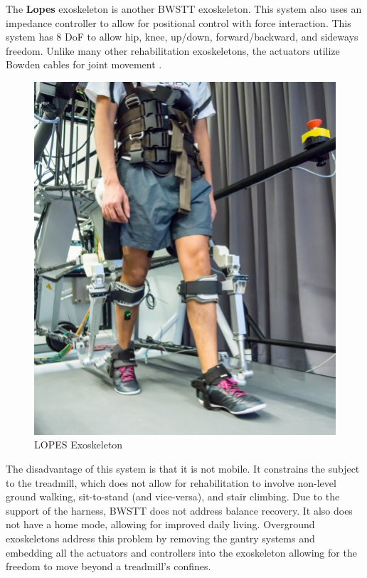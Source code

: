 The \textbf{Lopes} exoskeleton is another BWSTT exoskeleton. This system also uses an impedance controller to allow for positional control with force interaction. This system has 8 DoF to allow hip, knee, up/down, forward/backward, and sideways freedom. Unlike many other rehabilitation exoskeletons, the actuators utilize Bowden cables for joint movement \cite{veneman2007design}. 

\begin{figure}[H]
    \centering
    \includegraphics[scale=0.6]{images/background/A-subject-walking-with-LOPES-II-exoskeleton.jpg}
    \caption[LOPES Exoskeleton]{LOPES Exoskeleton \cite{lopes}}
    \label{fig:lopes}
\end{figure}


The disadvantage of this system is that it is not mobile. It constrains the subject to the treadmill, which does not allow for rehabilitation to involve non-level ground walking, sit-to-stand (and vice-versa), and stair climbing. Due to the support of the harness, BWSTT does not address balance recovery. It also does not have a home mode, allowing for improved daily living. Overground exoskeletons address this problem by removing the gantry systems and embedding all the actuators and controllers into the exoskeleton allowing for the freedom to move beyond a treadmill's confines.

